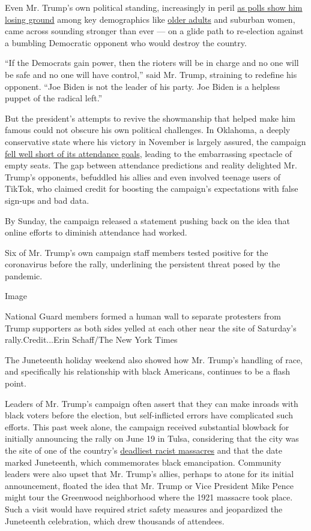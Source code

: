 Even Mr. Trump's own political standing, increasingly in peril
\href{https://www.nytimes.com/2020/06/03/us/politics/trump-campaign-virus-protests-polls.html}{as
polls show him losing ground} among key demographics like
\href{https://www.nytimes.com/2020/05/09/us/politics/trump-older-voters-2020.html}{older
adults} and suburban women, came across sounding stronger than ever ---
on a glide path to re-election against a bumbling Democratic opponent
who would destroy the country.

``If the Democrats gain power, then the rioters will be in charge and no
one will be safe and no one will have control,'' said Mr. Trump,
straining to redefine his opponent. ``Joe Biden is not the leader of his
party. Joe Biden is a helpless puppet of the radical left.''

But the president's attempts to revive the showmanship that helped make
him famous could not obscure his own political challenges. In Oklahoma,
a deeply conservative state where his victory in November is largely
assured, the campaign
\href{https://www.nytimes.com/2020/06/20/us/politics/tulsa-trump-rally.html}{fell
well short of its attendance goals}, leading to the embarrassing
spectacle of empty seats. The gap between attendance predictions and
reality delighted Mr. Trump's opponents, befuddled his allies and even
involved teenage users of TikTok, who claimed credit for boosting the
campaign's expectations with false sign-ups and bad data.

By Sunday, the campaign released a statement pushing back on the idea
that online efforts to diminish attendance had worked.

Six of Mr. Trump's own campaign staff members tested positive for the
coronavirus before the rally, underlining the persistent threat posed by
the pandemic.

Image

National Guard members formed a human wall to separate protesters from
Trump supporters as both sides yelled at each other near the site of
Saturday's rally.Credit...Erin Schaff/The New York Times

The Juneteenth holiday weekend also showed how Mr. Trump's handling of
race, and specifically his relationship with black Americans, continues
to be a flash point.

Leaders of Mr. Trump's campaign often assert that they can make inroads
with black voters before the election, but self-inflicted errors have
complicated such efforts. This past week alone, the campaign received
substantial blowback for initially announcing the rally on June 19 in
Tulsa, considering that the city was the site of one of the country's
\href{https://www.nytimes.com/2020/06/20/us/tulsa-greenwood-massacre.html}{deadliest
racist massacres} and that the date marked Juneteenth, which
commemorates black emancipation. Community leaders were also upset that
Mr. Trump's allies, perhaps to atone for its initial announcement,
floated the idea that Mr. Trump or Vice President Mike Pence might tour
the Greenwood neighborhood where the 1921 massacre took place. Such a
visit would have required strict safety measures and jeopardized the
Juneteenth celebration, which drew thousands of attendees.

